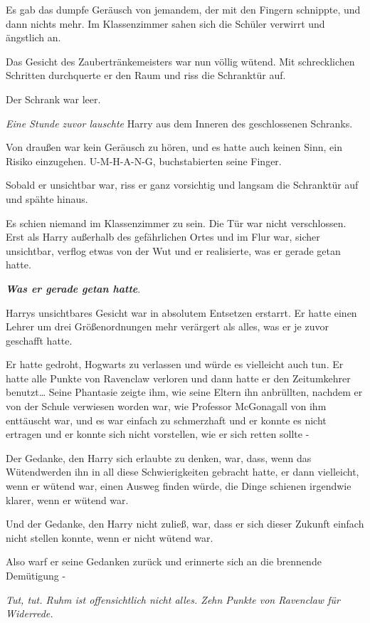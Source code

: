 {Es gab das dumpfe Geräusch von jemandem, der mit den Fingern schnippte, und dann nichts mehr. Im Klassenzimmer sahen sich die Schüler verwirrt und ängstlich an.

Das Gesicht des Zaubertränkemeisters war nun völlig wütend. Mit schrecklichen Schritten durchquerte er den Raum und riss die Schranktür auf.

Der Schrank war leer.

\emph{Eine Stunde zuvor lauschte} Harry aus dem Inneren des geschlossenen Schranks.

Von draußen war kein Geräusch zu hören, und es hatte auch keinen Sinn, ein Risiko einzugehen. U-M-H-A-N-G, buchstabierten seine Finger.

Sobald er unsichtbar war, riss er ganz vorsichtig und langsam die Schranktür auf und spähte hinaus.

Es schien niemand im Klassenzimmer zu sein. Die Tür war nicht verschlossen. Erst als Harry außerhalb des gefährlichen Ortes und im Flur war, sicher unsichtbar, verflog etwas von der Wut und er realisierte, was er gerade getan hatte.

\textbf{\emph{Was er gerade getan hatte}}.

Harrys unsichtbares Gesicht war in absolutem Entsetzen erstarrt. Er hatte einen Lehrer um drei Größenordnungen mehr verärgert als alles, was er je zuvor geschafft hatte.

Er hatte gedroht, Hogwarts zu verlassen und würde es vielleicht auch tun. Er hatte alle Punkte von Ravenclaw verloren und dann hatte er den Zeitumkehrer benutzt… Seine Phantasie zeigte ihm, wie seine Eltern ihn anbrüllten, nachdem er von der Schule verwiesen worden war, wie Professor McGonagall von ihm enttäuscht war, und es war einfach zu schmerzhaft und er konnte es nicht ertragen und er konnte sich nicht vorstellen, wie er sich retten sollte -

Der Gedanke, den Harry sich erlaubte zu denken, war, dass, wenn das Wütendwerden ihn in all diese Schwierigkeiten gebracht hatte, er dann vielleicht, wenn er wütend war, einen Ausweg finden würde, die Dinge schienen irgendwie klarer, wenn er wütend war.

Und der Gedanke, den Harry nicht zuließ, war, dass er sich dieser Zukunft einfach nicht stellen konnte, wenn er nicht wütend war.

Also warf er seine Gedanken zurück und erinnerte sich an die brennende Demütigung -

\emph{Tut, tut. Ruhm ist offensichtlich nicht alles. Zehn Punkte von Ravenclaw für Widerrede.}

}
